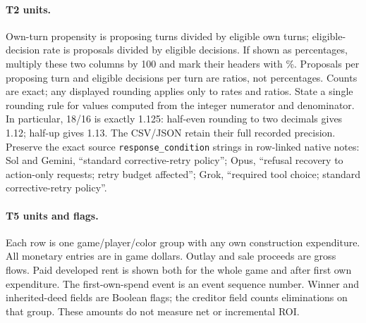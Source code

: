 
\paragraph{T2 units.}
Own-turn propensity is proposing turns divided by eligible own turns;
eligible-decision rate is proposals divided by eligible decisions. If shown
as percentages, multiply these two columns by 100 and mark their headers
with \%. Proposals per proposing turn and eligible decisions per turn are
ratios, not percentages. Counts are exact; any displayed rounding applies
only to rates and ratios. State a single rounding rule for values computed
from the integer numerator and denominator. In particular, 18/16 is exactly
1.125: half-even rounding to two decimals gives 1.12; half-up gives 1.13.
The CSV/JSON retain their full recorded precision.
Preserve the exact source \texttt{response\_condition} strings in row-linked
native notes: Sol and Gemini, ``standard corrective-retry policy''; Opus,
``refusal recovery to action-only requests; retry budget affected''; Grok,
``required tool choice; standard corrective-retry policy''.

\paragraph{T5 units and flags.}
Each row is one game/player/color group with any own construction expenditure.
All monetary entries are in game dollars. Outlay and sale proceeds are gross
flows. Paid developed rent is shown both for the whole game and after first
own expenditure. The first-own-spend event is an event sequence number.
Winner and inherited-deed fields are Boolean flags; the creditor field counts
eliminations on that group. These amounts do not measure net or incremental ROI.

